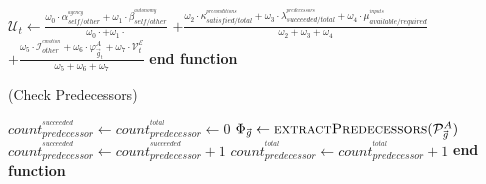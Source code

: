 \documentclass{article}
\begin{document}
	\begin{algorithm}
		\begin{algorithmic}[1]
			\State $\mathcal{U}_{t} \gets
			\frac{\omega_{0}\cdot \alpha_{self/other}^{^{agency}} +
			\omega_{1}\cdot \beta_{self/other}^{^{autonomy}}}{\omega_{0}\cdot +
			\omega_{1}\cdot}$
			\Statex
			\State \indent $+\frac{\omega_{2}\cdot
			\kappa_{satisfied/total}^{^{preconditions}} + \omega_{3}\cdot
			\lambda_{succeeded/total}^{^{predecessors}} + \omega_{4}\cdot
			\mu_{available/required}^{^{inputs}}}{\omega_{2} + \omega_{3} + \omega_{4}}$
			\Statex
			\State \indent $+\frac{\omega_{5}\cdot \mathcal{I}_{other}^{^{emotion}} +
			\omega_{6}\cdot \varphi_{\vec{\mathit{g}}_{t}}^A +
			\omega_{7}\cdot \mathcal{V}_{t}^{\mathcal{E}}}{\omega_{5} + \omega_{6} +
			\omega_{7}}$
			\Statex
				\State {}
			\Else
				\State {}
			\EndIf
		\EndFunction
		\State \textbf{end function}
	\end{algorithmic}
\end{algorithm}

\begin{algorithm}
	\caption{(Check Predecessors)}
	\label{array-sum}
	\begin{algorithmic}[1]
			\Statex
			\State $count_{predecessor}^{^{succeeded}} \gets
			count_{predecessor}^{^{total}} \gets 0$
			\Statex
			\State $\Phi_{\vec{\mathit{g}}} \gets
			\Call{extractPredecessors}{\mathcal{P}_{\vec{\mathit{g}}}^{A}}$
			\Statex
					\State $count_{predecessor}^{^{succeeded}} \gets count_{predecessor}^{^{succeeded}} + 1$
				\EndIf
				\State $count_{predecessor}^{^{total}} \gets count_{predecessor}^{^{total}} + 1$
			\EndFor
			\Statex
			\State {}
		\EndFunction 
	\State \textbf{end function}
	\end{algorithmic}
\end{algorithm}
\end{document}
